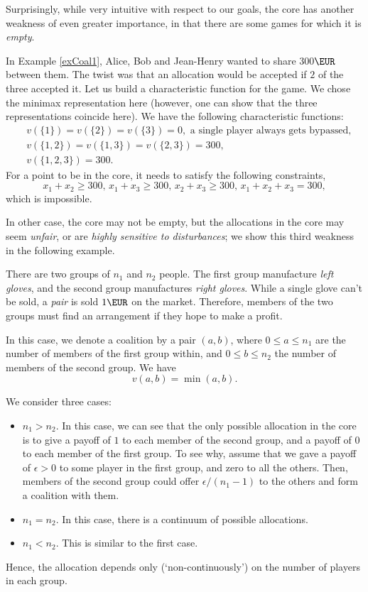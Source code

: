 Surprisingly, while very intuitive with respect to our goals, the core has another weakness of even greater importance, in that there are some games for which it is \emph{empty}.
\begin{example}
In Example \ref{exCoal1}, Alice, Bob and Jean-Henry wanted to share 300$\EUR$ between them. The twist was that an allocation would be accepted if $2$ of the three accepted it.
Let us build a characteristic function for the game. We chose the minimax representation here (however, one can show that the three representations coincide here).
We have the following characteristic functions:
$$
\begin{aligned}
&v(\{1\}) = v(\{2\}) = v(\{3\}) = 0, \text{ a single player always gets bypassed,}\\
&v(\{1,2\}) = v(\{1,3\}) = v(\{2,3\}) = 300, \\
&v(\{1,2,3\}) = 300.
\end{aligned}
$$
For a point to be in the core, it needs to satisfy the following constraints,
$$x_1 + x_2 \geq 300, \, x_1 + x_3 \geq 300, \, x_2 + x_3 \geq 300, \, x_1 + x_2 + x_3 = 300, $$
which is impossible.
\end{example}

In other case, the core may not be empty, but the allocations in the core may seem \emph{unfair}, or are \emph{highly sensitive to disturbances}; we show this third weakness in the following example.
\begin{example}
There are two groups of $n_1$ and $n_2$ people. The first group manufacture \emph{left gloves}, and the second group manufactures \emph{right gloves}. While a single glove can't be sold, a \emph{pair} is sold $1\EUR$ on the market. Therefore, members of the two groups must find an arrangement if they hope to make a profit.

In this case, we denote a coalition by a pair $(a,b)$, where $0 \leq  a \leq n_1$ are the number of members of the first group within, and $0 \leq b \leq n_2$ the number of members of the second group.
We have $$v(a,b) = \min(a,b). $$

We consider three cases:
\begin{itemize}
\item $n_1 > n_2$. In this case, we can see that the only possible allocation in the core is to give a payoff of $1$ to each member of the second group, and a payoff of $0$ to each member of the first group.
To see why, assume that we gave a payoff of $\epsilon > 0$ to some player in the first group, and zero to all the others. Then, members of the second group could offer $\epsilon/(n_1 - 1)$ to the others and form a coalition with them.
\item $n_1 = n_2$. In this case, there is a continuum of possible allocations.
\item $n_1 < n_2$. This is similar to the first case.
\end{itemize}
Hence, the allocation depends only (`non-continuously') on the number of players in each group.
\end{example}


